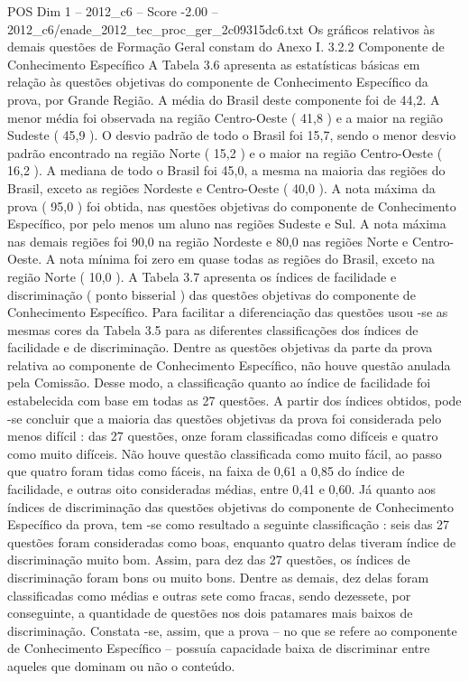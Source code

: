\begin{textsample}{POS Dim 1 – 2012\_c6 – Score -2.00 – 2012\_c6/enade\_2012\_tec\_proc\_ger\_2c09315dc6.txt}
Os gráficos relativos às demais questões de Formação Geral constam do Anexo I. 3.2.2 Componente de Conhecimento Específico A Tabela 3.6 apresenta as estatísticas básicas em relação às questões objetivas do componente de Conhecimento Específico da prova, por Grande Região.
A média do Brasil deste componente foi de 44,2.
A menor média foi observada na região Centro-Oeste ( 41,8 ) e a maior na região Sudeste ( 45,9 ).
O desvio padrão de todo o Brasil foi 15,7, sendo o menor desvio padrão encontrado na região Norte ( 15,2 ) e o maior na região Centro-Oeste ( 16,2 ).
A mediana de todo o Brasil foi 45,0, a mesma na maioria das regiões do Brasil, exceto as regiões Nordeste e Centro-Oeste ( 40,0 ).
A nota máxima da prova ( 95,0 ) foi obtida, nas questões objetivas do componente de Conhecimento Específico, por pelo menos um aluno nas regiões Sudeste e Sul.
A nota máxima nas demais regiões foi 90,0 na região Nordeste e 80,0 nas regiões Norte e Centro-Oeste.
A nota mínima foi zero em quase todas as regiões do Brasil, exceto na região Norte ( 10,0 ).
A Tabela 3.7 apresenta os índices de facilidade e discriminação ( ponto bisserial ) das questões objetivas do componente de Conhecimento Específico.
Para facilitar a diferenciação das questões usou -se as mesmas cores da Tabela 3.5 para as diferentes classificações dos índices de facilidade e de discriminação.
Dentre as questões objetivas da parte da prova relativa ao componente de Conhecimento Específico, não houve questão anulada pela Comissão.
Desse modo, a classificação quanto ao índice de facilidade foi estabelecida com base em todas as 27 questões.
A partir dos índices obtidos, pode -se concluir que a maioria das questões objetivas da prova foi considerada pelo menos difícil : das 27 questões, onze foram classificadas como difíceis e quatro como muito difíceis.
Não houve questão classificada como muito fácil, ao passo que quatro foram tidas como fáceis, na faixa de 0,61 a 0,85 do índice de facilidade, e outras oito consideradas médias, entre 0,41 e 0,60.
Já quanto aos índices de discriminação das questões objetivas do componente de Conhecimento Específico da prova, tem -se como resultado a seguinte classificação : seis das 27 questões foram consideradas como boas, enquanto quatro delas tiveram índice de discriminação muito bom.
Assim, para dez das 27 questões, os índices de discriminação foram bons ou muito bons.
Dentre as demais, dez delas foram classificadas como médias e outras sete como fracas, sendo dezessete, por conseguinte, a quantidade de questões nos dois patamares mais baixos de discriminação.
Constata -se, assim, que a prova – no que se refere ao componente de Conhecimento Específico – possuía capacidade baixa de discriminar entre aqueles que dominam ou não o conteúdo.

\end{textsample}

